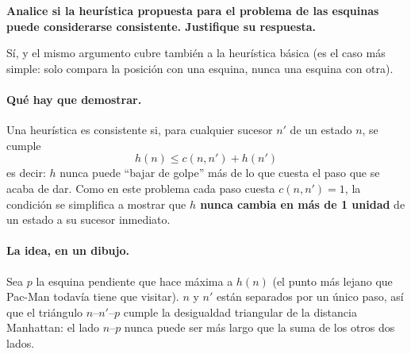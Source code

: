 \textbf{Analice si la heurística propuesta para el problema de las esquinas puede considerarse
consistente. Justifique su respuesta.}

Sí, y el mismo argumento cubre también a la heurística básica (es el caso más simple: solo compara
la posición con una esquina, nunca una esquina con otra).

\paragraph{Qué hay que demostrar.} Una heurística es consistente si, para cualquier sucesor $n'$
de un estado $n$, se cumple
$$h(n) \le c(n,n') + h(n')$$
es decir: $h$ nunca puede ``bajar de golpe'' más de lo que cuesta el paso que se acaba de dar. Como
en este problema cada paso cuesta $c(n,n')=1$, la condición se simplifica a mostrar que
\textbf{$h$ nunca cambia en más de 1 unidad} de un estado a su sucesor inmediato.

\paragraph{La idea, en un dibujo.} Sea $p$ la esquina pendiente que hace máxima a $h(n)$ (el punto
más lejano que Pac-Man todavía tiene que visitar). $n$ y $n'$ están separados por un único paso, así
que el triángulo $n$--$n'$--$p$ cumple la desigualdad triangular de la distancia Manhattan: el lado
$n$--$p$ nunca puede ser más largo que la suma de los otros dos lados.

\begin{center}
\end{center}

